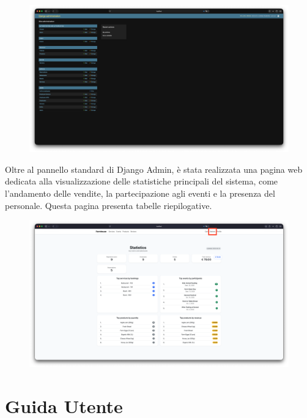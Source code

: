 \documentclass[a4paper,12pt]{report}
\begin{document}
\begin{figure}[H]
    \centering
    \includegraphics[width=\textwidth, trim=0 0 0 0]{./img/admin/DjangoAdmin.png}
    \vspace{-1em}
    \label{fig:django-admin}
\end{figure}

Oltre al pannello standard di Django Admin, è stata realizzata una pagina web dedicata alla 
visualizzazione delle statistiche principali del sistema, come l'andamento delle vendite, la 
partecipazione agli eventi e la presenza del personale. Questa pagina presenta tabelle 
riepilogative.

\begin{figure}[H]
    \centering
    \includegraphics[width=\textwidth, trim=0 0 0 0]{./img/admin/statistic.png}
    \vspace{-1em}
    \label{fig:statistiche}
\end{figure}

\appendix
\chapter{Guida Utente}
\end{document}
